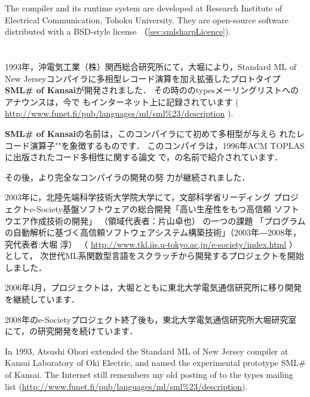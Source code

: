 	The \smlsharp{} compiler and its runtime system are developed at
Research Institute of Electrical Communication,  Tohoku University.
	They are open-source software distributed with a BSD-style
\smlsharp{} license （\ref{sec:smlsharpLicence}).
\fi%

\section{}
\label{sec:smlsharpHistory}

\ifjp%
	1993年，沖電気工業（株）関西総合研究所にて，大堀により，Standard
ML of New Jerseyコンパイラに多相型レコード演算を加え拡張したプロトタイプ
{\bf SML\# of Kansai}が開発されました．
	その時の\smlsharp{}のtypesメーリングリストへのアナウンスは，今で
もインターネット上に記録されています
(
\url{http://www.funet.fi/pub/languages/ml/sml%23/description}
).

	{\bf SML\# of Kansai}の名前は，このコンパイラにて初めて多相型が与えら
れたレコード演算子"{\bf \code{\#}}"を象徴するものです．
	このコンパイラは，1996年ACM TOPLASに出版されたコード多相性に関する論文
\cite{ohor95toplas}で，{\bf \smlsharp{}}の名前で紹介されています．

	その後，より完全な\smlsharp{}コンパイラの開発の努
力が継続されました．

	2003年に，北陸先端科学技術大学院大学にて，文部科学省リーディング
プロジェクトe-Society基盤ソフトウェアの総合開発「高い生産性をもつ高信頼
ソフトウエア作成技術の開発」
（領域代表者：片山卓也）
の一つの課題
「プログラムの自動解析に基づく高信頼ソフトウェアシステム構築技術」（2003年―2008年，究代表者:大堀 淳）
（
\url{http://www.tkl.iis.u-tokyo.ac.jp/e-society/index.html}
）
として，
次世代ML系関数型言語\smlsharp{}をスクラッチから開発するプロジェクトを開始しました．

2006年4月，プロジェクトは，大堀とともに東北大学電気通信研究所に移り開発
を継続しています．

2008年のe-Societyプロジェクト終了後も，東北大学電気通信研究所大堀研究室
にて，\smlsharp{}の研究開発を続けています．

\else%

	In 1993, Atsushi Ohori extended the Standard ML of New Jersey
compiler at Kansai Laboratory of Oki Electric, and named the
experimental prototype SML\# of Kansai.
	The Internet still remembers my old posting of \smlsharp{} to
the types mailing list 
(\url{http://www.funet.fi/pub/languages/ml/sml%23/description}).

